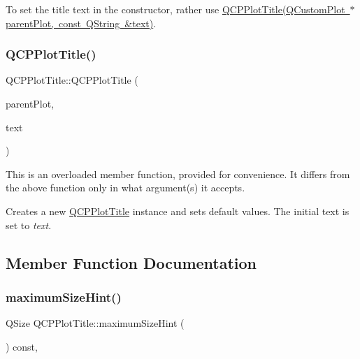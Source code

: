 To set the title text in the constructor, rather use \mbox{\hyperlink{class_q_c_p_plot_title_a90b9f46ceccbeee41f71c895a8c7ee1f}{Q\+C\+P\+Plot\+Title(\+Q\+Custom\+Plot $\ast$parent\+Plot, const Q\+String \&text)}}. \mbox{\label{class_q_c_p_plot_title_a90b9f46ceccbeee41f71c895a8c7ee1f}} 
\subsubsection{\texorpdfstring{Q\+C\+P\+Plot\+Title()}{QCPPlotTitle()}\hspace{0.1cm}{\footnotesize\ttfamily [2/2]}}
{\footnotesize\ttfamily Q\+C\+P\+Plot\+Title\+::\+Q\+C\+P\+Plot\+Title (\begin{DoxyParamCaption}\item[{\mbox{\hyperlink{class_q_custom_plot}{Q\+Custom\+Plot}} $\ast$}]{parent\+Plot,  }\item[{const Q\+String \&}]{text }\end{DoxyParamCaption})\hspace{0.3cm}{\ttfamily [explicit]}}

This is an overloaded member function, provided for convenience. It differs from the above function only in what argument(s) it accepts.

Creates a new \mbox{\hyperlink{class_q_c_p_plot_title}{Q\+C\+P\+Plot\+Title}} instance and sets default values. The initial text is set to {\itshape text}. 

\subsection{Member Function Documentation}
\mbox{\label{class_q_c_p_plot_title_ae24c395b5d3be64b42dcb9e27ed023c4}} 
\subsubsection{\texorpdfstring{maximum\+Size\+Hint()}{maximumSizeHint()}}
{\footnotesize\ttfamily Q\+Size Q\+C\+P\+Plot\+Title\+::maximum\+Size\+Hint (\begin{DoxyParamCaption}{ }\end{DoxyParamCaption}) const\hspace{0.3cm}{\ttfamily [protected]}, {\ttfamily [virtual]}}

